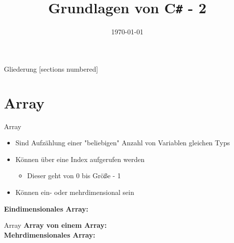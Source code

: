 



\title{Grundlagen von C\texttt{\#} - 2}
\date{\today}




\maketitle

\begin{frame}{Gliederung}
	[sections numbered]
	\tableofcontents
\end{frame}

\section{Array}
\begin{frame}{Array}
	\begin{itemize}
		\item Sind Aufzählung einer "beliebigen" Anzahl von Variablen gleichen Typs
		\item Können über eine Index aufgerufen werden
		\begin{itemize}
			\item Dieser geht von 0 bis Größe - 1
		\end{itemize}
		\item Können ein- oder mehrdimensional sein
	\end{itemize}
	\textbf{Eindimensionales Array:}\\
		
\end{frame}

\begin{frame}{Array}
	\textbf{Array von einem Array:}\\
	
	\textbf{Mehrdimensionales Array:}\\
		
\end{frame}

